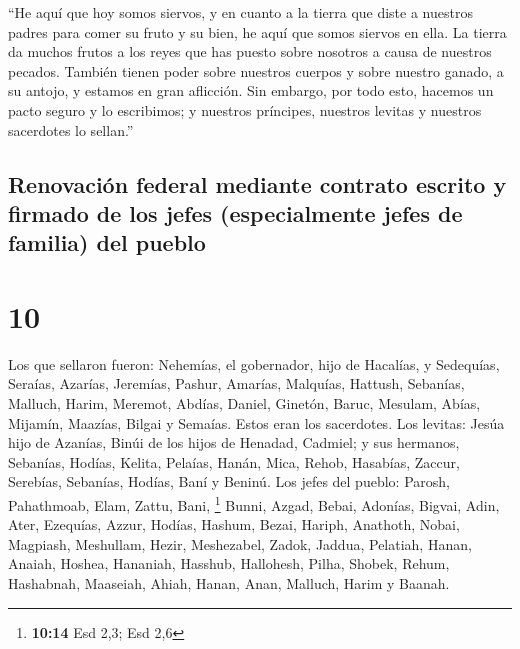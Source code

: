  ``He aquí que hoy somos siervos, y en cuanto a la tierra
que diste a nuestros padres para comer su fruto y su bien, he aquí que
somos siervos en ella.  La tierra da muchos frutos a los
reyes que has puesto sobre nosotros a causa de nuestros pecados. También
tienen poder sobre nuestros cuerpos y sobre nuestro ganado, a su antojo,
y estamos en gran aflicción.  Sin embargo, por todo esto,
hacemos un pacto seguro y lo escribimos; y nuestros príncipes, nuestros
levitas y nuestros sacerdotes lo sellan.''

\hypertarget{renovaciuxf3n-federal-mediante-contrato-escrito-y-firmado-de-los-jefes-especialmente-jefes-de-familia-del-pueblo}{%
\subsection{Renovación federal mediante contrato escrito y firmado de
los jefes (especialmente jefes de familia) del
pueblo}\label{renovaciuxf3n-federal-mediante-contrato-escrito-y-firmado-de-los-jefes-especialmente-jefes-de-familia-del-pueblo}}

\hypertarget{section-9}{%
\section{10}\label{section-9}}

 Los que sellaron fueron: Nehemías, el gobernador, hijo de
Hacalías, y Sedequías,  Seraías, Azarías, Jeremías,
 Pashur, Amarías, Malquías,  Hattush,
Sebanías, Malluch,  Harim, Meremot, Abdías, 
Daniel, Ginetón, Baruc,  Mesulam, Abías, Mijamín,
 Maazías, Bilgai y Semaías. Estos eran los sacerdotes.
 Los levitas: Jesúa hijo de Azanías, Binúi de los hijos de
Henadad, Cadmiel;  y sus hermanos, Sebanías, Hodías,
Kelita, Pelaías, Hanán,  Mica, Rehob, Hasabías,
 Zaccur, Serebías, Sebanías,  Hodías, Baní
y Beninú.  Los jefes del pueblo: Parosh, Pahathmoab,
Elam, Zattu, Bani, \footnote{\textbf{10:14} Esd 2,3; Esd 2,6}
 Bunni, Azgad, Bebai,  Adonías, Bigvai,
Adin,  Ater, Ezequías, Azzur,  Hodías,
Hashum, Bezai,  Hariph, Anathoth, Nobai, 
Magpiash, Meshullam, Hezir,  Meshezabel, Zadok, Jaddua,
 Pelatiah, Hanan, Anaiah,  Hoshea,
Hananiah, Hasshub,  Hallohesh, Pilha, Shobek,
 Rehum, Hashabnah, Maaseiah,  Ahiah,
Hanan, Anan,  Malluch, Harim y Baanah.

